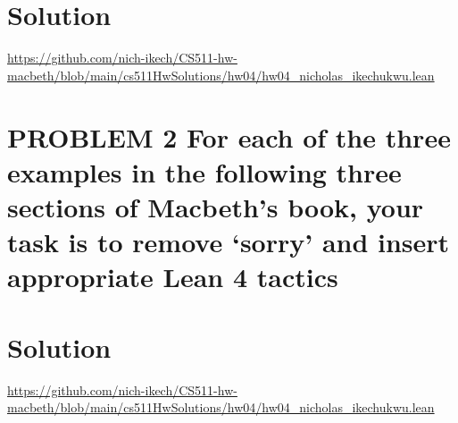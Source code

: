 \documentclass{article}
\begin{document}
\section*{Solution}

\url{https://github.com/nich-ikech/CS511-hw-macbeth/blob/main/cs511HwSolutions/hw04/hw04_nicholas_ikechukwu.lean}

\newpage

\section*{PROBLEM 2 For each of the three examples in the following three sections of Macbeth’s book,
your task is to remove ‘sorry’ and insert appropriate Lean 4 tactics}
\section*{Solution}

\url{https://github.com/nich-ikech/CS511-hw-macbeth/blob/main/cs511HwSolutions/hw04/hw04_nicholas_ikechukwu.lean}
\end{document}
